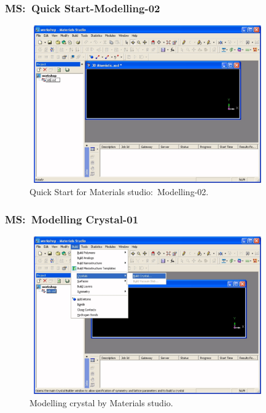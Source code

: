 \frame
{
	\frametitle{\textrm{MS:~Quick Start-Modelling-02}}
\begin{figure}[h!]
\centering
\vspace*{-0.10in}
\includegraphics[height=2.68in,width=4.00in,viewport=0 0 1090 760,clip]{Figures/MS-New_Project-05.png}
\caption{\tiny \textrm{Quick Start for Materials studio:~Modelling-02.}}%
\label{MS-Quick_Start-Modelling-02}
\end{figure}
}

\frame
{
	\frametitle{\textrm{MS:~Modelling Crystal-01}}
\begin{figure}[h!]
\centering
\vspace*{-0.10in}
\includegraphics[height=2.68in,width=4.00in,viewport=0 0 1090 760,clip]{Figures/MS-New_Project-06.png}
\caption{\tiny \textrm{Modelling crystal by Materials studio.}}%
\label{MS-Modelling-Crystal-01}
\end{figure}
}

